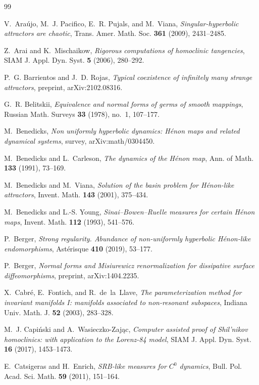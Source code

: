 \documentclass[11pt]{amsart}
\theoremstyle{definition}
\theoremstyle{remark}
\begin{document}
\begin{thebibliography}{99}

V.~Ara\'ujo, M.~J. Pacifico, E.~R. Pujals, and M.~Viana,
\emph{Singular-hyperbolic attractors are chaotic},
Trans. Amer. Math. Soc. \textbf{361} (2009), 2431--2485.

Z.~Arai and K.~Mischaikow,
\emph{Rigorous computations of homoclinic tangencies},
SIAM J. Appl. Dyn. Syst. \textbf{5} (2006), 280--292.

P.~G. Barrientos and J.~D. Rojas,
\emph{Typical coexistence of infinitely many strange attractors},
preprint, arXiv:2102.08316.

G.~R. Belitskii,
\emph{Equivalence and normal forms of germs of smooth mappings},
Russian Math. Surveys \textbf{33} (1978), no.~1, 107--177.

M.~Benedicks,
\emph{Non uniformly hyperbolic dynamics: H\'enon maps and related dynamical systems},
survey, arXiv:math/0304450.

M.~Benedicks and L.~Carleson,
\emph{The dynamics of the H\'enon map},
Ann. of Math. \textbf{133} (1991), 73--169.

M.~Benedicks and M.~Viana,
\emph{Solution of the basin problem for H\'enon-like attractors},
Invent. Math. \textbf{143} (2001), 375--434.

M.~Benedicks and L.-S. Young,
\emph{Sinai--Bowen--Ruelle measures for certain H\'enon maps},
Invent. Math. \textbf{112} (1993), 541--576.

P.~Berger,
\emph{Strong regularity. Abundance of non-uniformly hyperbolic H\'enon-like endomorphisms},
Ast\'erisque \textbf{410} (2019), 53--177.

P.~Berger,
\emph{Normal forms and Misiurewicz renormalization for dissipative surface diffeomorphisms},
preprint, arXiv:1404.2235.

X.~Cabr\'e, E.~Fontich, and R.~de~la~Llave,
\emph{The parameterization method for invariant manifolds I: manifolds associated to non-resonant subspaces},
Indiana Univ. Math. J. \textbf{52} (2003), 283--328.

M.~J. Capi\'nski and A.~Wasieczko-Zaj\k{a}c,
\emph{Computer assisted proof of Shil'nikov homoclinics: with application to the Lorenz-84 model},
SIAM J. Appl. Dyn. Syst. \textbf{16} (2017), 1453--1473.

E.~Catsigeras and H.~Enrich,
\emph{SRB-like measures for $C^0$ dynamics},
Bull. Pol. Acad. Sci. Math. \textbf{59} (2011), 151--164.


\end{thebibliography}
\end{document}
